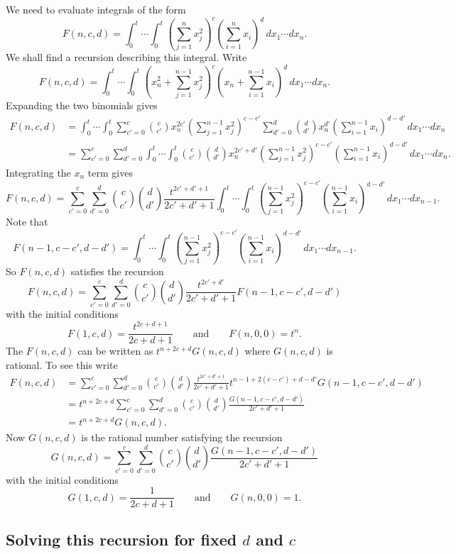 \documentclass[draftcls, onecolumn, 11pt]{IEEEtran}
\begin{document}
We need to evaluate integrals of the form
\[
F(n,c,d) = \int^{t}_{0} \cdots \int^{t}_{0} \left(\sum_{j=1}^{n} x_j^2\right)^c \left( \sum_{i=1}^{n} x_i \right)^d \,dx_1\cdots dx_{n}.
 \]
We shall find a recursion describing this integral.  Write
\[
F(n,c,d) = \int^t_0 \cdots \int^t_0 \left(x_n^2 + \sum_{j=1}^{n-1} x_j^2\right)^c \left( x_n + \sum_{i=1}^{n-1} x_i \right)^d \,dx_1\cdots dx_n.
\]
Expanding the two binomials gives
\begin{align*}
F(n,c,d) &=  \int^t_0 \cdots \int^t_0 \sum_{c'=0}^{c} \binom{c}{c'} x_n^{2c'} \left(\sum_{j=1}^{n-1} x_j^2\right)^{c-c'}  \sum_{d'=0}^{d}\binom{d}{d'} x_n^{d'} \left(\sum_{i=1}^{n-1} x_i \right)^{d-d'} \,dx_1\cdots dx_{n} \\
&=  \sum_{c'=0}^{c} \sum_{d'=0}^d \int^t_0 \cdots \int^t_0 \binom{c}{c'} \binom{d}{d'} x_n^{2c'+d'} \left(\sum_{j=1}^{n-1} x_j^2\right)^{c-c'} \left(\sum_{i=1}^{n-1} x_i \right)^{d-d'} \,dx_1\cdots dx_{n}. 
\end{align*}
Integrating the $x_n$ term gives
\[
F(n,c,d) = \sum_{c'=0}^{c} \sum_{d'=0}^{d} \binom{c}{c'}\binom{d}{d'} \frac{t^{2c'+d'+1}}{2c'+d'+1} \int^t_0 \cdots \int^t_0 \left(\sum_{j=1}^{n-1}x_j^2\right)^{c-c'}\left(\sum_{i=1}^{n-1} x_i \right)^{d-d'} \,dx_1\cdots dx_{n-1}.
\]
Note that
\[
F(n-1,c-c',d-d')  = \int^t_0 \cdots \int^t_0 \left(\sum_{j=1}^{n-1}x_j^2\right)^{c-c'}\left(\sum_{i=1}^{n-1} x_i \right)^{d-d'} \,dx_1\cdots dx_{n-1}.
\]
So $F(n,c,d)$ satisfies the recursion
\[
F(n,c,d) = \sum_{c'=0}^{c} \sum_{d'=0}^{d} \binom{c}{c'}\binom{d}{d'} \frac{t^{2c'+d'}}{2c'+d'+1}F(n-1,c-c',d-d')
\]
with the initial conditions
\[
F(1,c,d) = \frac{t^{2c+d+1}}{2c+d+1} \qquad \text{and} \qquad F(n,0,0) = t^n.
\]
The $F(n,c,d)$ can be written as $t^{n+2c+d}G(n,c,d)$ where $G(n,c,d)$ is rational.  To see this write
\begin{align*}
F(n,c,d) &=  \sum_{c'=0}^{c} \sum_{d'=0}^{d} \binom{c}{c'}\binom{d}{d'} \frac{t^{2c'+d'+1}}{2c'+d'+1}t^{n-1+2(c-c')+d-d'}G(n-1,c-c',d-d') \\
&=  t^{n+2c+d}\sum_{c'=0}^{c} \sum_{d'=0}^{d} \binom{c}{c'}\binom{d}{d'} \frac{G(n-1,c-c',d-d')}{2c'+d'+1} \\
&=  t^{n+2c+d}G(n,c,d).
\end{align*}
Now $G(n,c,d)$ is the rational number satisfying the recursion
\[
G(n,c,d) = \sum_{c'=0}^{c} \sum_{d'=0}^{d} \binom{c}{c'}\binom{d}{d'} \frac{G(n-1,c-c',d-d')}{2c'+d'+1}
\]
with the initial conditions
\[
G(1,c,d) = \frac{1}{2c+d+1} \qquad \text{and} \qquad G(n,0,0) = 1.
\]

\subsection{Solving this recursion for fixed $d$ and $c$}\label{sec:solv-this-recurs}
\newcommand{\calG}{\mathcal G}
\end{document}
